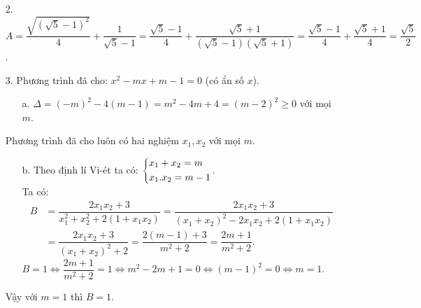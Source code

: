 \begin{ex}
{\begin{enumerate}
        \item[2.] $A=\dfrac{\sqrt{\left(\sqrt{5}-1\right)^2}}{4}+\dfrac{1}{\sqrt{5}-1}=\dfrac{\sqrt{5}-1}{4}+\dfrac{\sqrt{5}+1}{\left(\sqrt{5}-1\right)\left(\sqrt{5}+1\right)}=\dfrac{\sqrt{5}-1}{4}+\dfrac{\sqrt{5}+1}{4}=\dfrac{\sqrt{5}}{2}$.
        \item[3.] Phương trình đã cho: $x^2-mx+m-1=0$ (có ẩn số $x$).
        \begin{itemize}
        \item[a.] $\Delta = (-m)^2-4(m-1)=m^2-4m+4=\left(m-2\right)^2\ge 0$ với mọi $m$.
        \end{itemize}
        Phương trình đã cho luôn có hai nghiệm $x_1,x_2$ với mọi $m$.
        \begin{itemize}
        \item[b.] Theo định lí Vi-ét ta có: $\left\{\begin{aligned}&x_1+x_2=m\\&x_1.x_2=m-1\end{aligned}\right.$.\\
        Ta có: 
\begin{align*}
B&=\dfrac{2x_1x_2+3}{x_1^2+x_2^2+2\left(1+x_1x_2\right)}=\dfrac{2x_1x_2+3}{\left(x_1+x_2\right)^2-2x_1x_2+2\left(1+x_1x_2\right)}\\
&=\dfrac{2x_1x_2+3}{\left(x_1+x_2\right)^2+2}=\dfrac{2\left(m-1\right)+3}{m^2+2}=\dfrac{2m+1}{m^2+2}.
\end{align*}        
        $B=1\Leftrightarrow \dfrac{2m+1}{m^2+2}=1\Leftrightarrow m^2-2m+1=0\Leftrightarrow \left(m-1\right)^2=0\Leftrightarrow m=1$.
        \end{itemize}
        Vậy với $m=1$ thì $B=1$.
    \end{enumerate}
    }
\end{ex}

